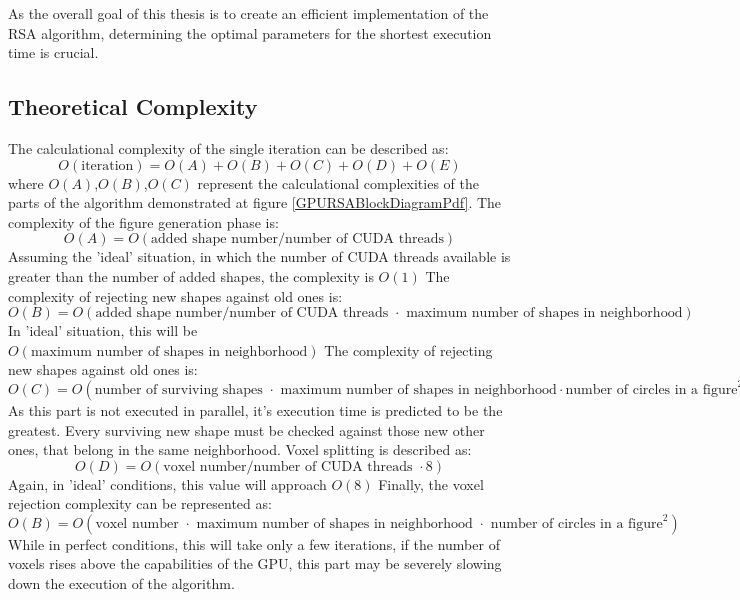 \documentclass[12pt, oneside]{report}
\begin{document}
As the overall goal of this thesis is to create an efficient implementation of the RSA algorithm, determining the optimal parameters for the shortest execution time is crucial.

\subsection{Theoretical Complexity}

The calculational complexity of the single iteration can be described as: \newline
\begin{equation*}
	O(\text{iteration}) = O(A)+O(B)+O(C)+O(D)+O(E)
\end{equation*}
where $O(A)$,$O(B)$,$O(C)$ represent the calculational complexities of the parts of the algorithm demonstrated at figure \ref{GPURSABlockDiagramPdf}. The complexity of the figure generation phase is:
\begin{equation*}
	O(A) = O(\text{added shape number}/ \text{number of CUDA threads})
\end{equation*}
Assuming the 'ideal' situation, in which the number of CUDA threads available is greater than the number of added shapes, the complexity is $O(1)$ \newline
The complexity of rejecting new shapes against old ones is: \newline
\begin{equation*}
	O(B) = O(\text{added shape number}/ \text{number of CUDA threads } \cdot \text{ maximum number of shapes in neighborhood})
\end{equation*}
In 'ideal' situation, this will be $O(\text{maximum number of shapes in neighborhood})$ \newline
The complexity of rejecting new shapes against old ones is: \newline
\begin{equation*}
	O(C) = O(\text{number of surviving shapes } \cdot \text{ maximum number of shapes in neighborhood} \cdot \text{number of circles in a figure}^2)
\end{equation*}
As this part is not executed in parallel, it's execution time is predicted to be the greatest. Every surviving new shape must be checked against those new other ones, that belong in the same neighborhood. \newline
Voxel splitting is described as: \newline
\begin{equation*}
	O(D) = O(\text{voxel number}/ \text{number of CUDA threads } \cdot 8)
\end{equation*}
Again, in 'ideal' conditions, this value will approach $O(8)$ \newline
Finally, the voxel rejection complexity can be represented as:
\begin{equation*}
	O(B) = O(\text{voxel number } \cdot \text{ maximum number of shapes in neighborhood } \cdot \text{ number of circles in a figure}^2)
\end{equation*}
While in perfect conditions, this will take only a few iterations, if the number of voxels rises above the capabilities of the GPU, this part may be severely slowing down the execution of the algorithm.
\end{document}
